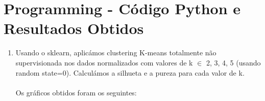 \documentclass[a4paper,12pt]{article} %
\begin{document}
\clearpage

\section*{Programming - Código Python e Resultados Obtidos}

\begin{enumerate}

\item 

Usando o sklearn, aplicámos clustering K-means totalmente não supervisionada nos dados normalizados com valores de k $\in$ {2, 3, 4, 5} (usando random state=0). Calculámos a silhueta e a pureza para cada valor de k. \\ \\

Os gráficos obtidos foram os seguintes:


\end{enumerate}
\end{document}
